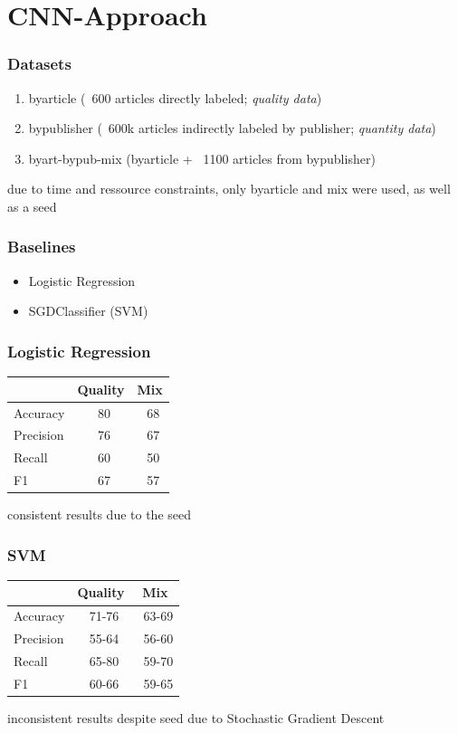 \section{CNN-Approach}

\begin{frame}
    \frametitle{Datasets}
    \begin{enumerate}
        \item byarticle (~600 articles directly labeled; \emph{quality data})
        \item bypublisher (~600k articles indirectly labeled by publisher; \emph{quantity data})
        \item byart-bypub-mix (byarticle + ~1100 articles from bypublisher)
    \end{enumerate}
    due to time and ressource constraints, only byarticle and mix were used, as well as a seed
\end{frame}

\begin{frame}
    \frametitle{Baselines}
    \begin{itemize}
        \item Logistic Regression
        \item SGDClassifier (SVM)
    \end{itemize}
\end{frame}

\begin{frame}
    \frametitle{Logistic Regression}
    \begin{tabular}{l|c|c}
                  & Quality & Mix \\\hline
        Accuracy  & ~80 & ~68 \\
        Precision & ~76 & ~67 \\
        Recall    & ~60 & ~50 \\
        F1        & ~67 & ~57
    \end{tabular}
    consistent results due to the seed
\end{frame}

\begin{frame}
    \frametitle{SVM}
    \begin{tabular}{l|c|c}
                  & Quality & Mix \\\hline
        Accuracy  & ~71-76 & ~63-69\\
        Precision & ~55-64 & ~56-60\\
        Recall    & ~65-80 & ~59-70\\
        F1        & ~60-66 & ~59-65
    \end{tabular}
    inconsistent results despite seed due to Stochastic Gradient Descent
\end{frame}

